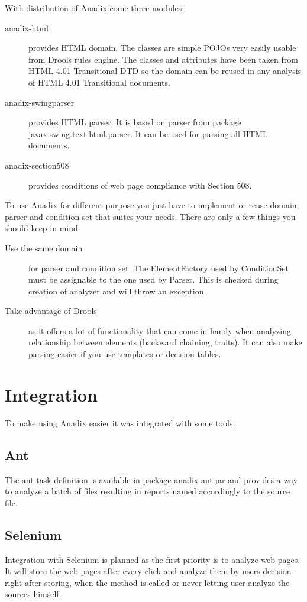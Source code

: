 \documentclass{report}
\begin{document}
With distribution of Anadix come three modules:
\begin{description}
  \item[anadix-html] provides HTML domain. The classes are simple POJOs very
  easily usable from Drools rules engine. The classes and attributes have been
  taken from HTML 4.01 Transitional DTD so the domain can be reused in any
  analysis of HTML 4.01 Transitional documents.
  \item[anadix-swingparser] provides HTML parser. It is based on parser from
  package javax.swing.text.html.parser. It can be used for parsing all HTML
  documents.
  \item[anadix-section508] provides conditions of web page compliance with
  Section 508.
\end{description}

To use Anadix for different purpose you just have to implement or reuse domain,
parser and condition set that suites your needs. There are only a few things you
should keep in mind:
\begin{description}
  \item[Use the same domain] for parser and condition set. The ElementFactory
  used by ConditionSet must be assignable to the one used by Parser. This is
  checked during creation of analyzer and will throw an exception.
  \item[Take advantage of Drools] as it offers a lot of functionality that can
  come in handy when analyzing relationship between elements (backward
  chaining, traits). It can also make parsing easier if you use templates or
  decision tables.
\end{description}

\chapter{Integration}
To make using Anadix easier it was integrated with some tools.
\section{Ant}
The ant task definition is available in package anadix-ant.jar and provides a
way to analyze a batch of files resulting in reports named accordingly to the
source file.

\section*{Selenium}
Integration with Selenium is planned as the first priority is to analyze web
pages. It will store the web pages after every click and analyze them by users
decision - right after storing, when the method is called or never letting user
analyze the sources himself.
\end{document}
